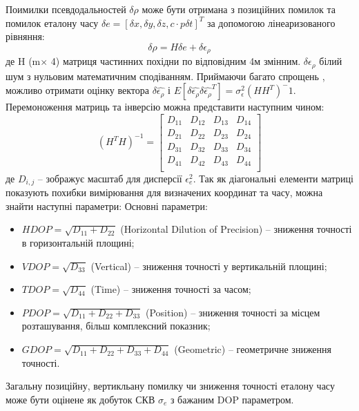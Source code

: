 Поимилки псевдодальностей $ \delta\rho $ може бути отримана з позиційних помилок 
 та помилок еталону часу $\delta e =[\delta x, \delta y, \delta z, c\cdot p\delta t]^T $
 за допомогою лінеаризованого рівняння:
\begin{equation}
\label{eq:sns_dop_err}
\delta \rho = H \delta e + \delta \epsilon_{\rho}
\end{equation}   
де H (m$\times$ 4) матриця частинних похідни по відповідним 4м змінним.
$\delta\epsilon_\rho$ білий шум з нульовим математичним сподіванням. Приймаючи
багато спрощень \cite{bib:gps4}, можливо отримати оцінку вектора $\delta\hat{\epsilon_\rho}$ і
$E[\delta\hat{\epsilon_\rho} \delta\hat{\epsilon_\rho}^T] = \sigma_\epsilon^2(HH^T)^-1$.
Перемоноження матриць та інверсію можна представити наступним чином:  
\begin{equation}
\label{eq:sns_dop_matrix}
(H^{T}H)^{-1} = \left[
\begin{array}{cccc}
D_{11} & D_{12} & D_{13} & D_{14} \\
D_{21} & D_{22} & D_{23} & D_{24} \\
D_{31} & D_{32} & D_{33} & D_{34} \\
D_{41} & D_{42} & D_{43} & D_{44} \\
\end{array}\right]
\end{equation}   
де $D_{i,j}$ -- зображує масштаб для дисперсії $\epsilon^{2}_{e}$. Так як діагональні
елементи матриці показують похибки вимірювання для визначених координат та часу, можна знайти наступні
параметри:
Основні параметри:
\begin{itemize}
 \item $HDOP = \sqrt{D_{11}+D_{22}}$ (Horizontal Dilution of Precision) -- зниження точності в горизонтальній площині;
 \item $VDOP = \sqrt{D_{33}}$ (Vertical) -- зниження точності у вертикальній площині;
 \item $TDOP = \sqrt{D_{44}}$ (Time) -- зниження точності за часом;
 \item $PDOP = \sqrt{D_{11}+D_{22}+D_{33}}$ (Position) -- зниження точності за місцем розташування, більш комплексний показник;
 \item $GDOP = \sqrt{D_{11}+D_{22}+D_{33}+D_{44}}$ (Geometric) -- геометричне зниження точності.
\end{itemize}

Загальну позиційну, вертикльану помилку чи зниження точності еталону часу може бути оцінене як 
добуток СКВ $\sigma_{e}$ з бажаним DOP параметром.

